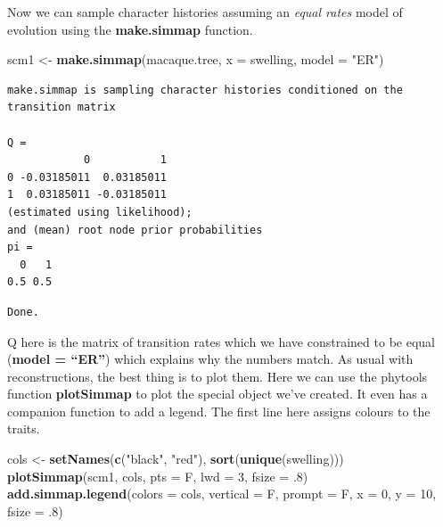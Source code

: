 \documentclass[
]{book}
\newenvironment{Shaded}{\begin{snugshade}}{\end{snugshade}}
\newcommand{\DataTypeTok}[1]{\textcolor[rgb]{0.13,0.29,0.53}{#1}}
\newcommand{\DecValTok}[1]{\textcolor[rgb]{0.00,0.00,0.81}{#1}}
\newcommand{\FloatTok}[1]{\textcolor[rgb]{0.00,0.00,0.81}{#1}}
\newcommand{\KeywordTok}[1]{\textcolor[rgb]{0.13,0.29,0.53}{\textbf{#1}}}
\newcommand{\NormalTok}[1]{#1}
\newcommand{\StringTok}[1]{\textcolor[rgb]{0.31,0.60,0.02}{#1}}
\begin{document}
Now we can sample character histories assuming an \emph{equal rates} model of evolution using the \textbf{make.simmap} function.

\begin{Shaded}
\begin{Highlighting}[]
\NormalTok{scm1 \textless{}{-}}\StringTok{ }\KeywordTok{make.simmap}\NormalTok{(macaque.tree, }\DataTypeTok{x =}\NormalTok{ swelling, }\DataTypeTok{model =} \StringTok{"ER"}\NormalTok{)}
\end{Highlighting}
\end{Shaded}

\begin{verbatim}
make.simmap is sampling character histories conditioned on the transition matrix

Q =
            0           1
0 -0.03185011  0.03185011
1  0.03185011 -0.03185011
(estimated using likelihood);
and (mean) root node prior probabilities
pi =
  0   1 
0.5 0.5 
\end{verbatim}

\begin{verbatim}
Done.
\end{verbatim}

Q here is the matrix of transition rates which we have constrained to be equal (\textbf{model = ``ER''}) which explains why the numbers match. As usual with reconstructions, the best thing is to plot them. Here we can use the phytools function \textbf{plotSimmap} to plot the special object we've created. It even has a companion function to add a legend. The first line here assigns colours to the traits.

\begin{Shaded}
\begin{Highlighting}[]
\NormalTok{cols \textless{}{-}}\StringTok{ }\KeywordTok{setNames}\NormalTok{(}\KeywordTok{c}\NormalTok{(}\StringTok{"black"}\NormalTok{, }\StringTok{"red"}\NormalTok{), }\KeywordTok{sort}\NormalTok{(}\KeywordTok{unique}\NormalTok{(swelling)))}
\KeywordTok{plotSimmap}\NormalTok{(scm1, cols, }\DataTypeTok{pts =}\NormalTok{ F, }\DataTypeTok{lwd =} \DecValTok{3}\NormalTok{, }\DataTypeTok{fsize =} \FloatTok{.8}\NormalTok{)}
\KeywordTok{add.simmap.legend}\NormalTok{(}\DataTypeTok{colors =}\NormalTok{ cols, }\DataTypeTok{vertical =}\NormalTok{ F, }\DataTypeTok{prompt =}\NormalTok{ F, }\DataTypeTok{x =} \DecValTok{0}\NormalTok{, }\DataTypeTok{y =} \DecValTok{10}\NormalTok{, }\DataTypeTok{fsize =} \FloatTok{.8}\NormalTok{)}
\end{Highlighting}
\end{Shaded}
\end{document}
